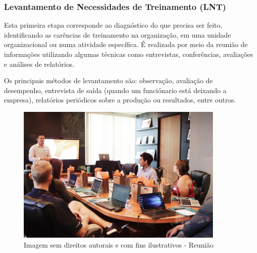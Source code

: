 \documentclass[12pt]{article}
\begin{document}
\subsubsection{Levantamento de Necessidades de Treinamento (LNT)}

Esta primeira etapa corresponde ao diagnóstico do que precisa ser feito, identificando as carências de treinamento na organização, em uma unidade organizacional ou numa atividade específica. É realizada por meio da reunião de informações utilizando algumas técnicas como entrevistas, conferências, avaliações e análises de relatórios.

Os principais métodos de levantamento são: observação, avaliação de desempenho, entrevista de saída (quando um funciónario está deixando a empresa), relatórios periódicos sobre a produção ou resultados, entre outros.

\begin{figure}[h]
	\centering
	\includegraphics[width=0.9\textwidth]{build/images/reuniao}
	\caption{Imagem sem direitos autorais e com fins ilustrativos - Reunião}
\end{figure}

\newpage
\end{document}
